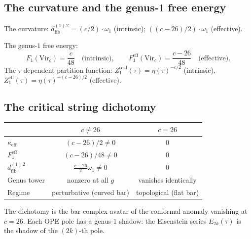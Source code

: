 \documentclass[11pt]{article}
\newcommand{\dfib}{d_{\mathrm{fib}}}
\begin{document}
\subsection{The curvature and the genus-$1$ free energy}
\label{subsec:wn-curvature-F1}

The curvature: $\dfib^{(1)\,2} = (c/2)\cdot\omega_1$ (intrinsic);
$((c-26)/2)\cdot\omega_1$ (effective).

The genus-$1$ free energy:
\begin{equation}\label{eq:wn-F1-intrinsic}
F_1(\mathrm{Vir}_c) = \frac{c}{48} \quad\text{(intrinsic)},
\qquad
F_1^{\mathrm{eff}}(\mathrm{Vir}_c) = \frac{c-26}{48}
\quad\text{(effective)}.
\end{equation}
The $\tau$-dependent partition function:
$Z_1^{\mathrm{scal}}(\tau) = \eta(\tau)^{-c/2}$ (intrinsic),
$Z_1^{\mathrm{eff}}(\tau) = \eta(\tau)^{-(c-26)/2}$ (effective).

\subsection{The critical string dichotomy}
\label{subsec:wn-critical}

\begin{center}
\renewcommand{\arraystretch}{1.2}
\begin{tabular}{@{}lcc@{}}
& $c \neq 26$ & $c = 26$ \\
\hline
$\kappa_{\mathrm{eff}}$ & $(c-26)/2 \neq 0$ & $0$ \\[3pt]
$F_1^{\mathrm{eff}}$ & $(c-26)/48 \neq 0$ & $0$ \\[3pt]
$\dfib^{(1)\,2}$ & $\frac{c-26}{2}\omega_1 \neq 0$ & $0$ \\[3pt]
Genus tower & nonzero at all $g$ & vanishes identically \\[3pt]
Regime & perturbative (curved bar) & topological (flat bar)
\end{tabular}
\end{center}

\noindent
The dichotomy is the bar-complex avatar of the conformal anomaly
vanishing at $c = 26$.  Each OPE pole has a genus-$1$ shadow:
the Eisenstein series $E_{2k}(\tau)$ is the shadow of the
$(2k)$-th pole.
\end{document}
